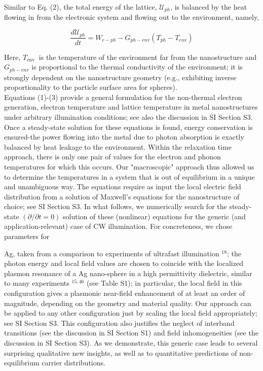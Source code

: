 \documentclass[10pt]{article}
\begin{document}
Similar to Eq. (2), the total energy of the lattice, $\mathcal{U}_{p h}$, is balanced by the heat flowing in from the electronic system and flowing out to the environment, namely,


\begin{equation*}
\frac{d \mathcal{U}_{p h}}{d t}=W_{e-p h}-G_{p h-e n v}\left(T_{p h}-T_{e n v}\right) \tag{3}
\end{equation*}


Here, $T_{\text {env }}$ is the temperature of the environment far from the nanostructure and $G_{p h-e n v}$ is proportional to the thermal conductivity of the environment; it is strongly dependent on the nanostructure geometry (e.g., exhibiting inverse proportionality to the particle surface area for spheres).\\
Equations (1)-(3) provide a general formulation for the non-thermal electron generation, electron temperature and lattice temperature in metal nanostructures under arbitrary illumination conditions; see also the discussion in SI Section S3. Once a steady-state solution for these equations is found, energy conservation is ensured-the power flowing into the metal due to photon absorption is exactly balanced by heat leakage to the environment. Within the relaxation time approach, there is only one pair of values for the electron and phonon temperatures for which this occurs. Our "macroscopic" approach thus allowed us to determine the temperatures in a system that is out of equilibrium in a unique and unambiguous way. The equations require as input the local electric field distribution from a solution of Maxwell's equations for the nanostructure of choice; see SI Section S3. In what follows, we numerically search for the steady-state $(\partial / \partial t=0)$ solution of these (nonlinear) equations for the generic (and application-relevant) case of CW illumination. For concreteness, we chose parameters for

Ag, taken from a comparison to experiments of ultrafast illumination ${ }^{18}$; the photon energy and local field values are chosen to coincide with the localized plasmon resonance of a Ag nano-sphere in a high permittivity dielectric, similar to many experiments ${ }^{15,46}$ (see Table S1); in particular, the local field in this configuration gives a plasmonic near-field enhancement of at least an order of magnitude, depending on the geometry and material quality. Our approach can be applied to any other configuration just by scaling the local field appropriately; see SI Section S3. This configuration also justifies the neglect of interband transitions (see the discussion in SI Section S1) and field inhomogeneities (see the discussion in SI Section S3). As we demonstrate, this generic case leads to several surprising qualitative new insights, as well as to quantitative predictions of non-equilibrium carrier distributions.
\end{document}
